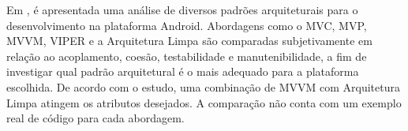 Em \cite{akhtar}, é apresentada uma análise de diversos padrões arquiteturais para o desenvolvimento na plataforma Android.
Abordagens como o MVC, MVP, MVVM, VIPER e a Arquitetura Limpa são comparadas subjetivamente em relação ao acoplamento, coesão, testabilidade e manutenibilidade, a fim de investigar qual padrão arquitetural é o mais adequado para a plataforma escolhida.
De acordo com o estudo, uma combinação de MVVM com Arquitetura Limpa atingem os atributos desejados.
A comparação não conta com um exemplo real de código para cada abordagem.